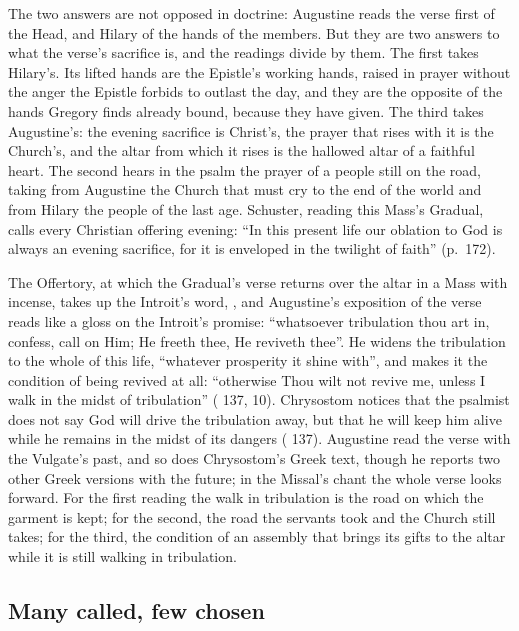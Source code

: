 The two answers are not opposed in doctrine: Augustine reads the verse first of
the Head, and Hilary of the hands of the members. But they are two answers to
what the verse's sacrifice is, and the readings divide by them. The first takes
Hilary's. Its lifted hands are the Epistle's working hands, raised in prayer
without the anger the Epistle forbids to outlast the day, and they are the
opposite of the hands Gregory finds already bound, because they have given. The
third takes Augustine's: the evening sacrifice is Christ's, the prayer that
rises with it is the Church's, and the altar from which it rises is the hallowed
altar of a faithful heart. The second hears in the psalm the prayer of a people
still on the road, taking from Augustine the Church that must cry to the end of
the world and from Hilary the people of the last age. Schuster, reading this
Mass's Gradual, calls every Christian offering evening: ``In this present life our oblation to God is
always an evening sacrifice, for it is enveloped in the twilight of faith''
(p.~172).

The Offertory, at which the Gradual's verse returns over the altar in a Mass
with incense, takes up the Introit's word, , and Augustine's exposition of the verse reads like a gloss on the Introit's
promise: ``whatsoever tribulation thou art in, confess, call on Him; He freeth
thee, He reviveth thee''. He widens the tribulation to the whole of this life,
``whatever prosperity it shine with'', and makes it the condition of being
revived at all: ``otherwise Thou wilt not revive me, unless I walk in the midst
of tribulation'' ( 137, 10). Chrysostom notices that the
psalmist does not say God will drive the tribulation away, but that he will keep
him alive while he remains in the midst of its dangers ( 137). Augustine read the verse with the Vulgate's past, and so does
Chrysostom's Greek text, though he reports two other Greek versions with the
future; in the Missal's chant the whole verse looks forward. For the first
reading the walk in tribulation is the road on which the garment is kept; for
the second, the road the servants took and the Church still takes; for the
third, the condition of an assembly that brings its gifts to the altar while it
is still walking in tribulation.

\subsection{Many called, few chosen}

